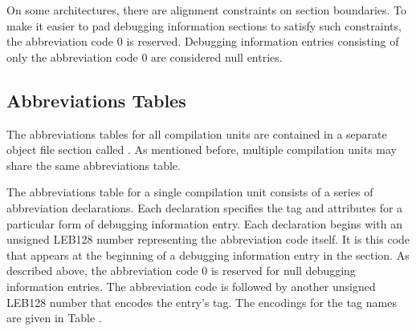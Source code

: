 On some architectures, there are alignment constraints on
section boundaries. To make it easier to pad debugging
information sections to satisfy such constraints, the
abbreviation code 0 is reserved. Debugging information entries
consisting of only the abbreviation code 0 are considered
null entries.

\subsection{Abbreviations Tables}
\label{datarep:abbreviationstables}

The abbreviations tables for all compilation units
are contained in a separate object file section called
\dotdebugabbrev{}.
As mentioned before, multiple compilation
units may share the same abbreviations table.

The abbreviations table for a single compilation unit consists
of a series of abbreviation declarations. Each declaration
specifies the tag and attributes for a particular form of
debugging information entry. Each declaration begins with
an unsigned LEB128
number representing the abbreviation
code itself. It is this code that appears at the beginning
of a debugging information entry in the 
\dotdebuginfo{}
section. As described above, the abbreviation
code 0 is reserved for null debugging information entries. The
abbreviation code is followed by another unsigned LEB128
number that encodes the entry\textquoteright s tag. The encodings for the
tag names are given in 
Table .


